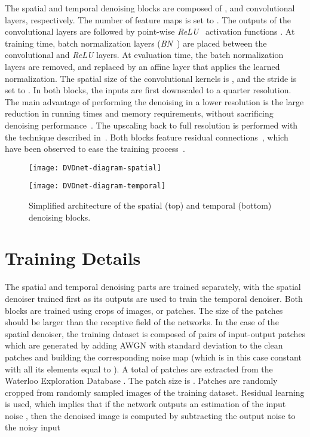 \documentclass{article}
\begin{document}
 	The spatial and temporal denoising blocks are composed of , and  convolutional layers, respectively. The number of feature maps is set to . The outputs of the convolutional layers are followed by point-wise \textit{ReLU}~\cite{Krizhevsky2012} activation functions . At training time, batch normalization layers (\textit{BN}~\cite{Ioffe2015}) are placed between the convolutional and \textit{ReLU} layers. At evaluation time, the batch normalization layers are removed, and replaced by an affine layer that applies the learned normalization. The spatial size of the convolutional kernels is , and the stride is set to . In both blocks, the inputs are first downscaled to a quarter resolution. The main advantage of performing the denoising in a lower resolution is the large reduction in running times and memory requirements, without sacrificing denoising performance~\cite{Zhang2017a,ipol.2019.231}. The upscaling back to full resolution is performed with the technique described in~\cite{Shi2016}. Both blocks feature residual connections~\cite{He2016}, which have been observed to ease the training process~\cite{ipol.2019.231}.
\begin{figure}[h]	
		\begin{minipage}[b]{1\linewidth}
			\centering
			\centerline{\texttt{[image: DVDnet-diagram-spatial]}}
\end{minipage}
\begin{minipage}[b]{1\linewidth}
			\centering
			\centerline{\texttt{[image: DVDnet-diagram-temporal]}}
\end{minipage}
		\caption{Simplified architecture of the spatial (top) and temporal (bottom) denoising blocks.}
		\label{fig:spatial-temporal-blocks}
	\end{figure}
\section{Training Details}
	\label{sec:training-details}
	
	The spatial and temporal denoising parts are trained separately, with the spatial denoiser trained first as its outputs are used to train the temporal denoiser. Both blocks are trained using crops of images, or patches. The size of the patches should be larger than the receptive field of the networks. In the case of the spatial denoiser, the training dataset is composed of pairs of input-output patches  which are generated by adding AWGN with standard deviation  to the clean patches  and building the corresponding noise map  (which is in this case constant with all its elements equal to ). A total of  patches are extracted from the Waterloo Exploration Database \cite{ma2017waterloo}. The patch size is . Patches are randomly cropped from randomly sampled images of the training dataset. Residual learning is used, which implies that if the network outputs an estimation of the input noise , then the denoised image is computed by subtracting the output noise to the noisy input
\end{document}
